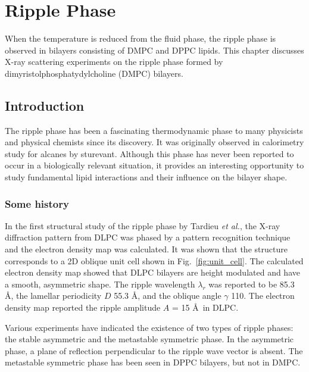 \chapter{Ripple Phase}\label{chap:ripple}
When the temperature is reduced from the fluid phase, 
the ripple phase is observed in bilayers consisting of DMPC and DPPC lipids.
This chapter discusses X-ray scattering experiments on the ripple phase 
formed by dimyristolphosphatydylcholine (DMPC) bilayers. 

\section{Introduction}\label{sec:ripple_introduction}
The ripple phase has been a fascinating thermodynamic phase to many physicists 
and physical chemists since its discovery. It was originally observed in 
calorimetry study for alcanes by sturevant. Although this phase has never been reported to 
occur in a biologically relevant situation, it provides an interesting opportunity
to study fundamental lipid interactions and their influence on the bilayer 
shape. 

\subsection{Some history}
In the first structural study of the ripple phase by Tardieu \textit{et al.},
the X-ray diffraction pattern from DLPC was phased by a pattern recognition
technique and the electron density map was calculated. It was shown that the structure
corresponds to a 2D oblique unit cell shown in Fig.~\ref{fig:unit_cell}.
The calculated 
electron density map showed that DLPC bilayers are height modulated
and have a smooth, asymmetric shape. 
The ripple wavelength $\lambda_r$ was reported to be 85.3 \AA, 
the lamellar periodicity $D$ 55.3 \AA, and the oblique angle
$\gamma$ 110\textdegree. 
The electron density map reported the ripple amplitude $A$ = 15 \AA\ in DLPC.

Various experiments have indicated the existence of two types of ripple phases:
the stable asymmetric and the metastable symmetric phase. In the asymmetric
phase, a plane of reflection perpendicular to the ripple wave vector is 
absent. The metastable symmetric phase has been seen in DPPC bilayers, but not
in DMPC.

